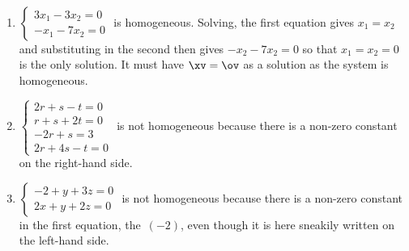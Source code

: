 \begin{example} \label{eg:homosys}
\ 
\begin{enumerate}
\item\label{eg:homosysi} 
\(\begin{cases}
3x_1-3x_2=0\\-x_1-7x_2=0
\end{cases}\) is homogeneous.  
Solving, the first equation gives \(x_1=x_2\) and substituting in the second then gives \(-x_2-7x_2=0\) so that \(x_1=x_2=0\) is the only solution.
It must have \(\xv=\ov\) as a solution as the system is homogeneous.
 
\item \(\begin{cases}
2r+s-t=0\\ r+s+2t=0\\-2r+s=3\\2r+4s-t=0
\end{cases}\) is not homogeneous because there is a non-zero constant on the right-hand side.
 
\item \(\begin{cases}
-2+y+3z=0\\2x+y+2z=0
\end{cases}\) is not homogeneous because there is a non-zero constant in the first equation, the~\((-2)\), even though it is here sneakily written on the left-hand side.
 

\end{enumerate}
\end{example}
